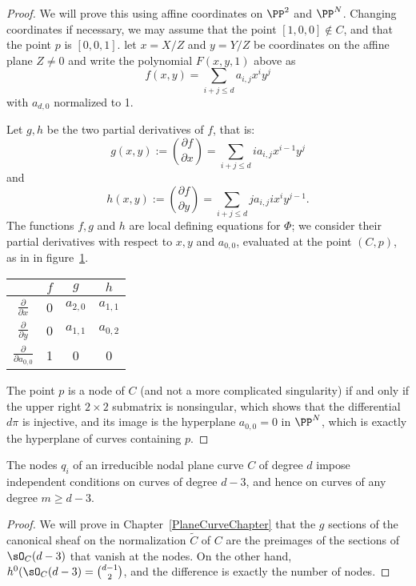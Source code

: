 \begin{proof}
We will prove this using affine coordinates on $\PP^2$ and $\PP^N$. Changing coordinates if necessary, we may assume that the point $[1,0,0] \notin C$, and that the point $p$ is $[0,0,1]$. let $x = X/Z$ and $y = Y/Z$ be coordinates on the affine plane $Z \neq 0$ and write the polynomial $F(x,y,1)$ above as
$$
f(x,y) = \sum_{i+j \leq d} a_{i,j} x^iy^j
$$
with $a_{d,0}$ normalized to 1. 

Let $g,h$ be the two partial derivatives of $f$, that is:
$$
g(x,y) := \binom{\partial f}{\partial x} = \sum_{i+j \leq d} i a_{i,j} x^{i-1}y^j
$$
and
$$
h(x,y) := \binom{\partial f}{\partial y} = \sum_{i+j \leq d} j a_{i,j} ix^{i}y^{j-1}.
$$
The functions $f, g$ and $h$ are local defining equations for $\Phi$; we consider their partial derivatives with respect to $x, y$ and $a_{0,0}$, evaluated at the point $(C,p)$, as in in figure~\ref{tang to Delta}.

\begin{table}[h!]\label{tang to Delta}
  \begin{center}
     \begin{tabular}{c|c|c|c} %
            & $f$ & $g$ & $h$ \\
      \hline
$\frac{\partial}{\partial x}$ & 0 & $a_{2,0}$ & $a_{1,1}$ \\
$\frac{\partial}{\partial y}$ & 0 & $a_{1,1}$ & $a_{0,2}$ \\
$\frac{\partial}{\partial a_{0,0}}$ & 1 & 0 & 0 
    \end{tabular}
  \end{center}
\end{table}

The point $p$ is a node of $C$ (and not a more complicated singularity) if and only if the upper right $2 \times 2$ submatrix is nonsingular, which shows that the differential $d\pi$ is injective, and its image is the hyperplane $a_{0,0} = 0$ in $\PP^N$, which is exactly the hyperplane of curves containing $p$.
\end{proof}

\begin{lemma}\label{adjoint independent}
The nodes $q_i$ of an irreducible nodal plane curve $C$ of degree $d$ impose independent conditions on curves of degree $d-3$, and hence on curves of any degree $m \geq d-3$.
\end{lemma}
\begin{proof}
We will prove in Chapter~\ref{PlaneCurveChapter} that the $g$ sections of the canonical sheaf on the normalization $\widetilde C$ of
$C$ are the preimages of the sections of $\sO_C(d-3)$ that vanish at the nodes. On the other hand, 
$h^0(\sO_C(d-3) = \binom{d-1}{2}$, and the difference is exactly the number of nodes.
\end{proof}

